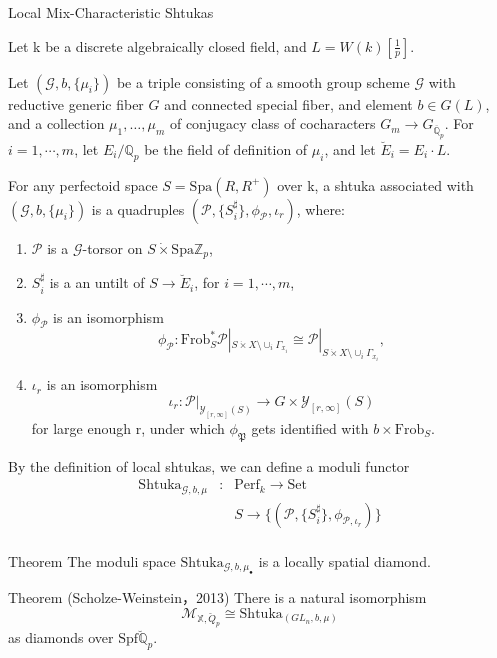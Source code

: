 \documentclass[aspectratio=1610]{ctexbeamer}
\def  \Frob     {\mathrm{Frob}}
\def  \Perf     {\mathrm{Perf}}
\def  \Set      {\mathrm{Set}}
\def  \Spa      {\mathrm{Spa}}
\def  \Spd      {\mathrm{Spf}}
\def  \Shtuka   {\mathrm{Shtuka}}
\def  \cg       {\mathcal{G}}
\def  \cm       {\mathcal{M}}
\def  \cp       {\mathcal{P}}
\def  \bq       {\mathbb{Q}}
\def  \bz       {\mathbb{Z}}
\def  \fp       {\mathfrak{P}}
\begin{document}
\begin{frame}{Local  Mix-Characteristic Shtukas}
	
Let k be a discrete algebraically closed field, and $L=W(k)[\frac{1}{p}]$.

	Let $(\cg,b, \{\mu_i\})$ be a triple consisting of a smooth group scheme $\mathcal{G}$ with reductive generic fiber $G$ and connected special fiber, and element $b \in G(L)$, and a collection $\mu_1, \dots, \mu_m$ of conjugacy class of cocharacters $G_m \to  G_{\overline{\bq}_p}$. For $i=1, \cdots, m$, let $E_i/\bq_p$ be the field of definition of $\mu_i$, and let $\breve{E}_i= E_i \cdot L$.
	
	For any perfectoid space $S= \Spa(R, R^{+})$ over k, a shtuka associated with $(\cg,b, \{\mu_i\})$ is a  quadruples $(\cp, \{S_i^{\sharp}\}, \phi_{\cp}, \iota_r)$, where:
	
	\begin{enumerate}
		\item  $\cp$ is a $\cg$-torsor on  $S \dot{\times} \Spa \bz_p$,
		\item  $S^{\sharp}_i$ is a an untilt of $S \to \breve{E}_i$, for $i=1, \cdots, m$,
		\item  $\phi_{\cp}$ is an isomorphism
		$$
		\phi_{\cp}: \Frob_S^*  \cp |_{S \dot{\times} X  \setminus \cup_i \Gamma_{x_i}}  \cong \cp |_{S \dot{\times} X \setminus \cup_i \Gamma_{x_i}},
		$$
		\item $\iota_r$ is an isomorphism
		$$
		\iota_r: \cp|_{\mathcal{Y}_{[r, \infty]}(S)}  \to  G \times \mathcal{Y}_{[r, \infty]}(S)
		$$
		for large enough r, under which $\phi_{\fp}$ gets identified with $b \times \Frob_S$.
	\end{enumerate}

\end{frame}








\begin{frame}

By the definition of local  shtukas, we can define a moduli functor
\begin{eqnarray*}
	\Shtuka_{\cg,b, \mu} &: & \Perf_k  \to  \Set  \\
	& &    S   \to   \{(\cp, \{S_i^{\sharp}\}, \phi_{\cp, \iota_r})\} \\ 
\end{eqnarray*}

\begin{alertblock}{Theorem}
	The moduli space $\Shtuka_{\cg,b, \mu_{\bullet}}$ is a locally spatial diamond.
\end{alertblock}




\begin{alertblock}{Theorem (Scholze-Weinstein，2013)}
	There is a natural isomorphism
	$$
	\cm_{\mathbb{X}, \breve{Q}_p} \cong  \Shtuka_{(GL_n, b, \mu)}
	$$
	as diamonds over $\Spd \breve{\bq}_p$.
\end{alertblock}

\end{frame}
\end{document}

